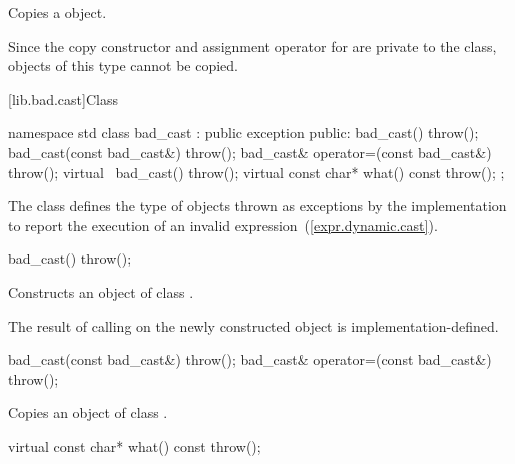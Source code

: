 \begin{itemdescr}
\pnum
\effects
Copies a  object.

\pnum
\notes
Since the copy constructor and assignment operator for
 are private to the class, objects of this
type cannot be copied.
\end{itemdescr}

[lib.bad.cast]{Class }

%
\begin{codeblock}
namespace std {
  class bad_cast : public exception {
  public:
    bad_cast() throw();
    bad_cast(const bad_cast&) throw();
    bad_cast& operator=(const bad_cast&) throw();
    virtual ~bad_cast() throw();
    virtual const char* what() const throw();
  };
}
\end{codeblock}

\pnum
The class
defines the type of objects thrown
as exceptions by the implementation to report the execution of an invalid
expression~(\ref{expr.dynamic.cast}).

%
%
\begin{itemdecl}
bad_cast() throw();
\end{itemdecl}

\begin{itemdescr}
\pnum
\effects
Constructs an object of class
.

\pnum
\notes
The result of calling
on the newly constructed object is implementation-defined.%
\end{itemdescr}

%
%
\begin{itemdecl}
    bad_cast(const bad_cast&) throw();
    bad_cast& operator=(const bad_cast&) throw();
\end{itemdecl}

\begin{itemdescr}
\pnum
\effects
Copies an object of class
.
\end{itemdescr}

%
\begin{itemdecl}
virtual const char* what() const throw();
\end{itemdecl}

